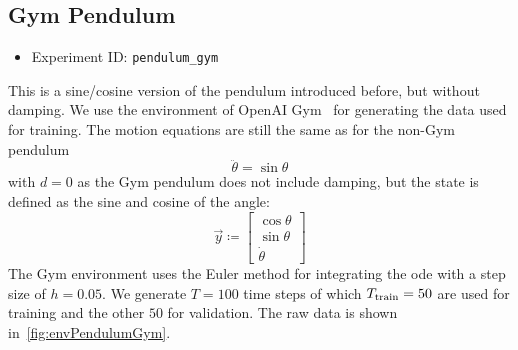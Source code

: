 	\subsection{Gym Pendulum}
		\begin{itemize}
			\item Experiment ID: \texttt{pendulum\_gym}
		\end{itemize}

		This is a sine/cosine version of the pendulum introduced before, but without damping. We use the environment of OpenAI Gym~\cite{brockmanOpenAIGym2016} for generating the data used for training. The motion equations are still the same as for the non-Gym pendulum
		\begin{equation*}
			\ddot{\theta} = \sin\theta
		\end{equation*}
		with \( d = 0 \) as the Gym pendulum does not include damping, but the state is defined as the sine and cosine of the angle:
		\begin{equation*}
			\vec{y} \coloneqq
				\begin{bmatrix}
					\cos\theta \\
					\sin\theta \\
					\dot{\theta}
				\end{bmatrix}
		\end{equation*}
		The Gym environment uses the Euler method for integrating the \ac{ode} with a step size of \( h = 0.05 \). We generate \( T = 100 \) time steps of which \( T_{\mathrm{train}} = 50 \) are used for training and the other \(50\) for validation. The raw data is shown in~\autoref{fig:envPendulumGym}.

